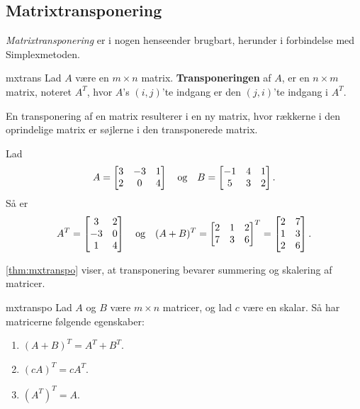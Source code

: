 \subsection{Matrixtransponering}
%
\textit{Matrixtransponering} er i nogen henseender brugbart, herunder i forbindelse med Simplexmetoden. 
%
%
%
\begin{defn}{}{mxtrans}
Lad $A$ være en $m \times n$ matrix. \textbf{Transponeringen} af $A$, er en $n \times m$ matrix, noteret $A^T$, hvor $A$'s $(i,j)$'te indgang er den $(j,i)$'te indgang i $A^T$.
\end{defn}
\noindent
%
En transponering af en matrix resulterer i en ny matrix, hvor rækkerne i den oprindelige matrix er søjlerne i den transponerede matrix.
\\
%
\begin{eks}
\label{eks:trans}
%
Lad 
%
\begin{align*}
A= 
\begin{bmatrix}
3	&	-3	&	1 \\
2	&	0	&	4
\end{bmatrix}
\text{\phantom{---}og\phantom{---}}
B= 
\begin{bmatrix}
-1	&	4	&	1\\
5	&	3	&	2
\end{bmatrix}.
\end{align*}
%
Så er
%
\begin{align*}
A^T =
\begin{bmatrix}
3	&	2\\
-3	&	0\\
1	&	4
\end{bmatrix}
\text{\phantom{---}og\phantom{---}}
(A+B)^T=
\begin{bmatrix}
2	&	1	&	2\\
7	&	3	&	6
\end{bmatrix}^T
=
\begin{bmatrix}
2	&	7\\
1	&	3\\
2	&	6
\end{bmatrix}.
\end{align*}
%
\end{eks}
%
%
\ref{thm:mxtranspo} viser, at transponering bevarer summering og skalering af matricer.
%
\begin{thm}{}{mxtranspo}
Lad $A$ og $B$ være $m \times n$ matricer, og lad $c$ være en skalar.
Så har matricerne følgende egenskaber:
\begin{enumerate}[label=(\alph*)]
\item $(A + B)^T = A^T + B^T$.
\item $(cA)^T = cA^T$.
\item $(A^T)^T = A$.
\end{enumerate}
\end{thm}
